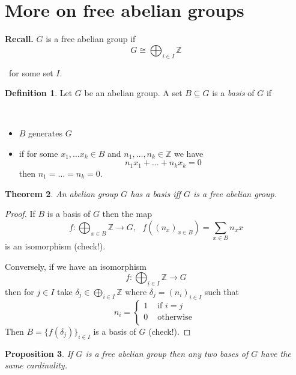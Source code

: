 \documentclass[12pt, letterpaper, oneside]{article}
\theoremstyle{plain}
\newtheorem{theorem}{Theorem}[section]
\newtheorem{proposition}[theorem]{Proposition}
\theoremstyle{definition}
\newtheorem{definition}[theorem]{Definition}
\newcommand{\Z}{{\mathbb Z}}
\newcommand{\bit}{\begin{itemize}}
\newcommand{\eit}{\end{itemize}}
\newcommand{\vs}{\vskip 5mm}
\begin{document}
\newpage
\section{More on free abelian groups}
\label{SEC_MOREFREEABGPS}

\textbf{Recall.} $G$ is a free abelian group if 
$$G\cong \bigoplus_{i\in I} \Z$$

\vskip -8mm

\ 
for some set $I$.

\vs\vs

\begin{definition}
Let $G$ be an abelian group. A set $B\subseteq G$ is a \emph{basis} of $G$ if 

\vskip -13mm

\ 
\bit 
\item $B$ generates $G$ 
\item if for some $x_{1}, \dots x_{k}\in B$ and 
$n_{1}, \dots, n_{k}\in \Z$ we have 
$$n_{1}x_{1} + \dots +  n_{k}x_{k} = 0$$ 
 then $n_{1}= \dots  = n_{k} = 0$.
\eit
\end{definition}

\vs\vs


\begin{theorem}
An abelian group $G$ has a basis iff $G$ is a free abelian group. 
\end{theorem}


\begin{proof}
If $B$ is a basis of $G$ then the map
$$f\colon \bigoplus_{x\in B} \Z \to G, \ \ \ f((n_{x})_{x\in B}) = \sum_{x\in B} n_{x}x$$
is an isomorphism (check!). 

Conversely, if we have an isomorphism 
$$f\colon \bigoplus_{i\in I} \Z \to G$$
then for $j\in I$ take $\delta_{j}\in \bigoplus_{i\in I}\Z$  where $\delta_{j} = (n_{i})_{i\in I}$ such that
$$
n_{i} = 
\begin{cases}
1 & \text{ if } i= j \\
0 & \text{ otherwise } \\
\end{cases}
$$
Then $B = \{f(\delta_{j})\}_{i\in I}$ is a basis of $G$ (check!). 

\end{proof}

\vs


\begin{proposition}
\label{PROP_FREEABBASISCARD}
If $G$ is a free abelian group then any two bases of $G$ have the same cardinality. 
\end{proposition}
\end{document}
